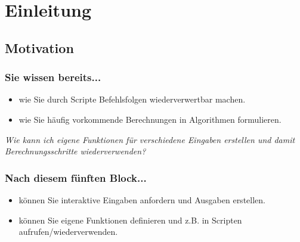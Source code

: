 



\setcounter{mchapter}{5}
\setcounter{mexercise}{0}


  

  \section{Einleitung}

  \subsection{Motivation}
  \begin{frame}
      \frametitle{Sie wissen bereits...}
      \begin{itemize}
          \item wie Sie durch Scripte Befehlsfolgen wiederverwertbar machen.
          \item wie Sie häufig vorkommende Berechnungen in Algorithmen formulieren.
      \end{itemize}

      \textit{Wie kann ich eigene Funktionen für verschiedene Eingaben erstellen und damit Berechnungsschritte wiederverwenden?}
  \end{frame}

  \begin{frame}
      \frametitle{Nach diesem fünften Block...}
      \begin{itemize}
          \item können Sie interaktive Eingaben anfordern und Ausgaben erstellen.
          \item können Sie eigene Funktionen definieren und z.B. in Scripten aufrufen/wiederverwenden.
      \end{itemize}
  \end{frame}

